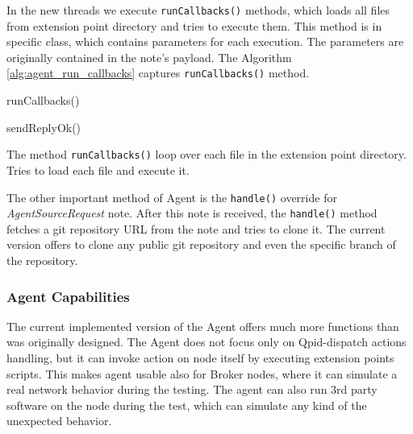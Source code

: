 In the new threads we execute \texttt{runCallbacks()} methods, which loads all files from extension point directory and tries to execute them. This method is in specific class, which contains parameters for each execution. The parameters are originally contained in the note's payload. The Algorithm \ref{alg:agent_run_callbacks} captures \texttt{runCallbacks()} method.

\begin{center}
	\begin{algorithm}[H]
		\LinesNumbered
		\DontPrintSemicolon


		\fce runCallbacks()\;


		sendReplyOk()\;

		 \caption{The method \texttt{runCallbacks()} loop over each file in the extension point directory. Tries to load each file and execute it.}
		 \label{alg:agent_run_callbacks}
	\end{algorithm}
\end{center}

The other important method of Agent is the \texttt{handle()} override for \emph{AgentSourceRequest} note. After this note is received, the \texttt{handle()} method fetches a git repository URL from the note and tries to clone it. The current version offers to clone any public git repository and even the specific branch of the repository.

\subsubsection*{Agent Capabilities}
\label{Agent Capabilities}
The current implemented version of the Agent offers much more functions than was originally designed. The Agent does not focus only on Qpid-dispatch actions handling, but it can invoke action on node itself by executing extension points scripts. This makes agent usable also for Broker nodes, where it can simulate a real network behavior during the testing. The agent can also run 3rd party software on the node during the test, which can simulate any kind of  the unexpected behavior.

